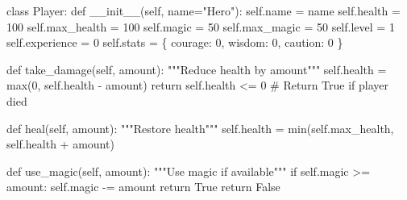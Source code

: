 \documentclass[
  letterpaper,
  DIV=11,
  numbers=noendperiod,
  oneside]{scrreprt}
\newenvironment{Shaded}{}{}
\newcommand{\BuiltInTok}[1]{\textcolor[rgb]{0.84,0.23,0.29}{#1}}
\newcommand{\CommentTok}[1]{\textcolor[rgb]{0.42,0.45,0.49}{#1}}
\newcommand{\ControlFlowTok}[1]{\textcolor[rgb]{0.84,0.23,0.29}{#1}}
\newcommand{\DecValTok}[1]{\textcolor[rgb]{0.00,0.36,0.77}{#1}}
\newcommand{\FunctionTok}[1]{\textcolor[rgb]{0.44,0.26,0.76}{#1}}
\newcommand{\KeywordTok}[1]{\textcolor[rgb]{0.84,0.23,0.29}{#1}}
\newcommand{\NormalTok}[1]{\textcolor[rgb]{0.14,0.16,0.18}{#1}}
\newcommand{\OperatorTok}[1]{\textcolor[rgb]{0.14,0.16,0.18}{#1}}
\newcommand{\StringTok}[1]{\textcolor[rgb]{0.01,0.18,0.38}{#1}}
\newcommand{\VariableTok}[1]{\textcolor[rgb]{0.89,0.38,0.04}{#1}}
\begin{document}
\begin{Shaded}
\begin{Highlighting}[]
\KeywordTok{class}\NormalTok{ Player:}
    \KeywordTok{def} \FunctionTok{\_\_init\_\_}\NormalTok{(}\VariableTok{self}\NormalTok{, name}\OperatorTok{=}\StringTok{"Hero"}\NormalTok{):}
        \VariableTok{self}\NormalTok{.name }\OperatorTok{=}\NormalTok{ name}
        \VariableTok{self}\NormalTok{.health }\OperatorTok{=} \DecValTok{100}
        \VariableTok{self}\NormalTok{.max\_health }\OperatorTok{=} \DecValTok{100}
        \VariableTok{self}\NormalTok{.magic }\OperatorTok{=} \DecValTok{50}
        \VariableTok{self}\NormalTok{.max\_magic }\OperatorTok{=} \DecValTok{50}
        \VariableTok{self}\NormalTok{.level }\OperatorTok{=} \DecValTok{1}
        \VariableTok{self}\NormalTok{.experience }\OperatorTok{=} \DecValTok{0}
        \VariableTok{self}\NormalTok{.stats }\OperatorTok{=}\NormalTok{ \{}
            \StringTok{\textquotesingle{}courage\textquotesingle{}}\NormalTok{: }\DecValTok{0}\NormalTok{,}
            \StringTok{\textquotesingle{}wisdom\textquotesingle{}}\NormalTok{: }\DecValTok{0}\NormalTok{,}
            \StringTok{\textquotesingle{}caution\textquotesingle{}}\NormalTok{: }\DecValTok{0}
\NormalTok{        \}}
    
    \KeywordTok{def}\NormalTok{ take\_damage(}\VariableTok{self}\NormalTok{, amount):}
        \CommentTok{"""Reduce health by amount"""}
        \VariableTok{self}\NormalTok{.health }\OperatorTok{=} \BuiltInTok{max}\NormalTok{(}\DecValTok{0}\NormalTok{, }\VariableTok{self}\NormalTok{.health }\OperatorTok{{-}}\NormalTok{ amount)}
        \ControlFlowTok{return} \VariableTok{self}\NormalTok{.health }\OperatorTok{\textless{}=} \DecValTok{0}  \CommentTok{\# Return True if player died}
    
    \KeywordTok{def}\NormalTok{ heal(}\VariableTok{self}\NormalTok{, amount):}
        \CommentTok{"""Restore health"""}
        \VariableTok{self}\NormalTok{.health }\OperatorTok{=} \BuiltInTok{min}\NormalTok{(}\VariableTok{self}\NormalTok{.max\_health, }\VariableTok{self}\NormalTok{.health }\OperatorTok{+}\NormalTok{ amount)}
    
    \KeywordTok{def}\NormalTok{ use\_magic(}\VariableTok{self}\NormalTok{, amount):}
        \CommentTok{"""Use magic if available"""}
        \ControlFlowTok{if} \VariableTok{self}\NormalTok{.magic }\OperatorTok{\textgreater{}=}\NormalTok{ amount:}
            \VariableTok{self}\NormalTok{.magic }\OperatorTok{{-}=}\NormalTok{ amount}
            \ControlFlowTok{return} \VariableTok{True}
        \ControlFlowTok{return} \VariableTok{False}
    

\end{Highlighting}
\end{Shaded}
\end{document}
